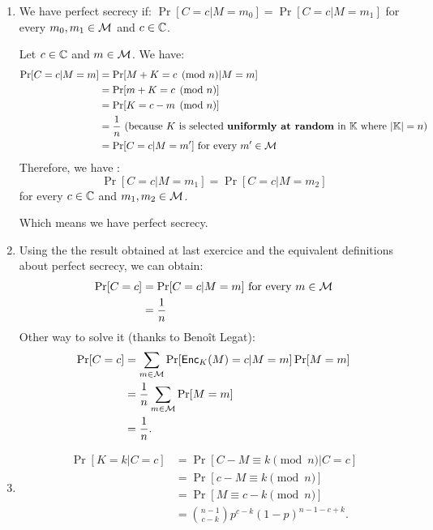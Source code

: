 \begin{solution}
  \begin{enumerate}
    \item
      We have perfect secrecy if: $\Pr[C = c | M = m_0] = \Pr[C = c | M = m_1] $ for every $m_0, m_1 \in \mathcal{M}$ and $c \in \mathbb{C}$.
      
      Let $c \in \mathbb{C}$ and $m\in \mathcal{M}$.
      We have:
      \begin{align*}
        \Pr[C = c | M = m]
        & = \Pr[M + K = c \pmod{n} | M = m]\\
        & = \Pr[m + K = c \pmod{n}]\\
        & = \Pr[K = c - m \pmod{n}]\\
        & = \frac{1}{n} \text{ (because $K$ is selected \textbf{uniformly at random} in } \mathbb{K} \text{ where } {\left\lvert\mathbb{K}\right\lvert} = n )\\
        & = \Pr[C = c | M = m'] \text{ for every } m' \in \mathcal{M}
      \end{align*}
      Therefore, we have :
      \[
        \Pr[C = c | M = m_1] = \Pr[C = c | M = m_2]
      \]
      for every $c \in \mathbb{C}$ and $m_1,m_2 \in \mathcal{M}$.

      Which means we have perfect secrecy.
    \item
        Using the the result obtained at last exercice and the equivalent definitions about perfect secrecy, we can obtain:
      \begin{align*}
          \Pr[C = c]  & = \Pr[C = c | M = m] \text{ for every } m \in \mathcal{M} \\
          & = \frac{1}{n}
      \end{align*}
      Other way to solve it (thanks to Benoît Legat):
      \begin{align*}
        \Pr[C = c]
        & = \sum_{m \in \mathcal{M}} \Pr[\operatorname{\mathsf{Enc}}_K(M) = c | M = m] \Pr[M = m]\\
        & = \frac{1}{n} \sum_{m \in \mathcal{M}} \Pr[M = m]\\
        & = \frac{1}{n}.
      \end{align*}
    \item
      \begin{align*}
        \Pr[K = k | C = c]
        & = \Pr[C - M \equiv k \pmod{n} | C = c]\\
        & = \Pr[c - M \equiv k \pmod{n}]\\
        & = \Pr[M \equiv c - k \pmod{n}]\\
        & = {n-1 \choose c-k} p^{c-k} (1-p)^{n-1-c+k}.
      \end{align*}
  \end{enumerate}
\end{solution}



